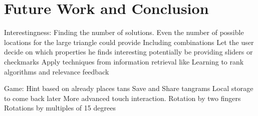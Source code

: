 \chapter{Future Work and Conclusion}\label{chapter:conclusion}


Interestingness:
Finding the number of solutions. Even the number of possible locations for the large triangle could provide  
Including combinations 
Let the user decide on which properties he finds interesting potentially be providing sliders or checkmarks 
Apply techniques from information retrieval like Learning to rank algorithms and relevance feedback \cite{he08}

Game:
Hint based on already places tans
Save and Share tangrams
Local storage to come back later
More advanced touch interaction. Rotation by two fingers
Rotations by multiples of 15 degrees


